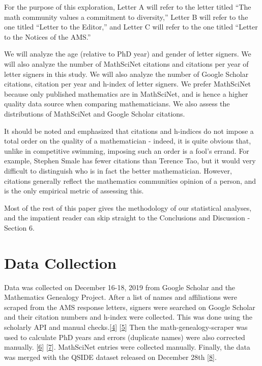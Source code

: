 \documentclass[]{article}
\begin{document}
For the purpose of this exploration, Letter A will refer to the letter
titled ``The math community values a commitment to diversity,'' Letter B
will refer to the one titled ``Letter to the Editor,'' and Letter C will
refer to the one titled ``Letter to the Notices of the AMS.''

We will analyze the age (relative to PhD year) and gender of letter
signers. We will also analyze the number of MathSciNet citations and
citations per year of letter signers in this study. We will also analyze
the number of Google Scholar citations, citation per year and h-index of
letter signers. We prefer MathSciNet because only published mathematics
are in MathSciNet, and is hence a higher quality data source when
comparing mathematicians. We also assess the distributions of MathSciNet
and Google Scholar citations.

It should be noted and emphasized that citations and h-indices do not
impose a total order on the quality of a mathematician - indeed, it is
quite obvious that, unlike in competitive swimming, imposing such an
order is a fool's errand. For example, Stephen Smale has fewer citations
than Terence Tao, but it would very difficult to distinguish who is in
fact the better mathematician. However, citations generally reflect the
mathematics communities opinion of a person, and is the only empirical
metric of assessing this.

Most of the rest of this paper gives the methodology of our statistical
analyses, and the impatient reader can skip straight to the Conclusions
and Discussion - Section 6.

\hypertarget{data-collection}{%
\section{Data Collection}\label{data-collection}}

Data was collected on December 16-18, 2019 from Google Scholar and the
Mathematics Genealogy Project. After a list of names and affiliations
were scraped from the AMS response letters, signers were searched on
Google Scholar and their citation numbers and h-index were collected.
This was done using the scholarly API and manual
checks.{[}\protect\hyperlink{Bibliography}{4}{]}
{[}\protect\hyperlink{Bibliography}{5}{]} Then the
math-genealogy-scraper was used to calculate PhD years and errors
(duplicate names) were also corrected manually.
{[}\protect\hyperlink{Bibliography}{6}{]}
{[}\protect\hyperlink{Bibliography}{7}{]}. MathSciNet entries were
collected manually. Finally, the data was merged with the QSIDE dataset
released on December 28th {[}\protect\hyperlink{Bibliography}{8}{]}.
\end{document}
